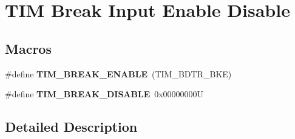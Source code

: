 \hypertarget{group___t_i_m___break___input__enable__disable}{}\section{T\+IM Break Input Enable Disable}
\label{group___t_i_m___break___input__enable__disable}
\subsection*{Macros}
\begin{DoxyCompactItemize}
\item 
\mbox{\label{group___t_i_m___break___input__enable__disable_ga3f966247b03532b8d93f9bddc032d863}} 
\#define {\bfseries T\+I\+M\+\_\+\+B\+R\+E\+A\+K\+\_\+\+E\+N\+A\+B\+LE}~(T\+I\+M\+\_\+\+B\+D\+T\+R\+\_\+\+B\+KE)
\item 
\mbox{\label{group___t_i_m___break___input__enable__disable_ga8b34ce60f3f08c4b0d924a6546939994}} 
\#define {\bfseries T\+I\+M\+\_\+\+B\+R\+E\+A\+K\+\_\+\+D\+I\+S\+A\+B\+LE}~0x00000000U
\end{DoxyCompactItemize}


\subsection{Detailed Description}
